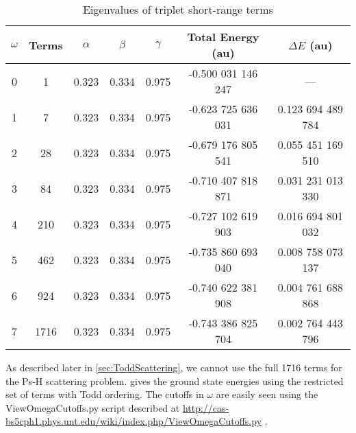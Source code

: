 \documentclass[Dissertation.tex]{subfiles}
\begin{document}
\setlength{\abovecaptionskip}{6pt}   %
\setlength{\belowcaptionskip}{6pt}   %
\begin{table}[H]
\centering
\begin{tabular}{c c c c c c c}
\toprule
$\omega$ & Terms & $\alpha$ & $\beta$ & $\gamma$ & Total Energy (au) & $\Delta E$ (au) \\ [0.5ex]
\midrule
0 & 1    & 0.323 & 0.334 & 0.975 & -0.500 031 146 247 & --- \\
1 & 7    & 0.323 & 0.334 & 0.975 & -0.623 725 636 031 & 0.123 694 489 784 \\
2 & 28   & 0.323 & 0.334 & 0.975 & -0.679 176 805 541 & 0.055 451 169 510 \\
3 & 84   & 0.323 & 0.334 & 0.975 & -0.710 407 818 871 & 0.031 231 013 330 \\
4 & 210  & 0.323 & 0.334 & 0.975 & -0.727 102 619 903 & 0.016 694 801 032 \\
5 & 462  & 0.323 & 0.334 & 0.975 & -0.735 860 693 040 & 0.008 758 073 137 \\
6 & 924  & 0.323 & 0.334 & 0.975 & -0.740 622 381 908 & 0.004 761 688 868 \\
7 & 1716 & 0.323 & 0.334 & 0.975 & -0.743 386 825 704 & 0.002 764 443 796 \\
\bottomrule
\end{tabular}
\caption{Eigenvalues of triplet short-range terms}
\label{tab:BoundEnergy3}
\end{table}

As described later in \cref{sec:ToddScattering}, we cannot use the full 1716 terms for the Ps-H scattering problem.  gives the ground state energies using the restricted set of terms with Todd ordering. The cutoffs in $\omega$ are easily seen using the ViewOmegaCutoffs.py script described at \url{http://cas-bs5cph1.phys.unt.edu/wiki/index.php/ViewOmegaCutoffs.py} \cite{Wiki}.
\end{document}
